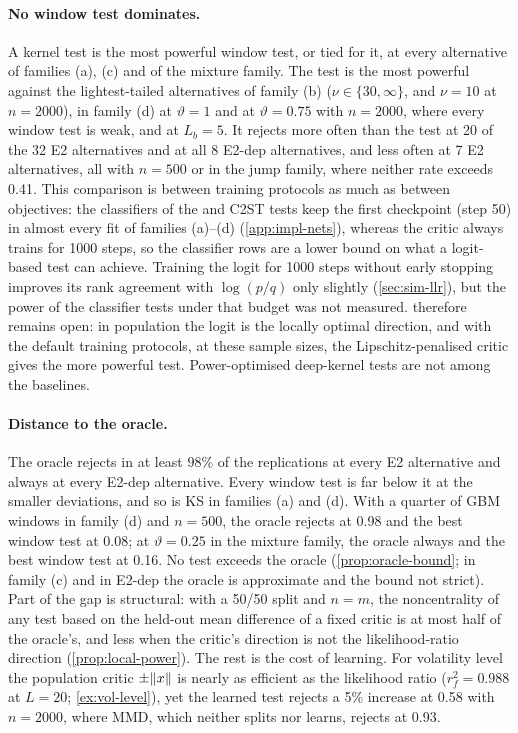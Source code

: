 \paragraph{No window test dominates.}
A kernel test is the most powerful window test, or tied for it, at every alternative of families
(a), (c) and of the mixture family. The \WC{} test is the most powerful against the lightest-tailed
alternatives of family (b) ($\nu\in\{30,\infty\}$, and $\nu=10$ at $n=2000$), in family (d) at
$\vartheta=1$ and at $\vartheta=0.75$ with $n=2000$, where every window test is weak, and at
$L_b=5$. It rejects more often than the \LRC{} test at 20 of the 32 E2 alternatives and at all 8
E2-dep alternatives, and less often at 7 E2 alternatives, all with $n=500$ or in the jump family,
where neither rate exceeds 0.41. This comparison is between training protocols as much as between
objectives: the classifiers of the \LRC{} and C2ST tests keep the first checkpoint (step 50) in
almost every fit of families (a)--(d) (\cref{app:impl-nets}), whereas the critic always trains
for 1000 steps, so the classifier rows are a lower bound on what a logit-based test can achieve.
Training the logit for 1000 steps without early stopping improves its rank agreement with
$\log(p/q)$ only slightly (\cref{sec:sim-llr}), but the power of the classifier tests under that
budget was not measured.  therefore remains open: in population the logit is
the locally optimal direction, and with the default training protocols, at these sample sizes,
the Lipschitz-penalised critic gives the more powerful test. Power-optimised deep-kernel tests
\citep{liu2020learning} are not among the baselines.

\paragraph{Distance to the oracle.}
The oracle rejects in at least 98\% of the replications at every E2 alternative and always at every
E2-dep alternative. Every window test is far below it at the smaller deviations, and so is KS in
families (a) and (d). With a quarter of GBM windows in family (d) and $n=500$, the oracle rejects at
0.98 and the best window test at 0.08; at $\vartheta=0.25$ in the mixture family, the oracle always
and the best window test at 0.16. No test exceeds the oracle (\cref{prop:oracle-bound}; in family
(c) and in E2-dep the oracle is approximate and the bound not strict). Part of the gap is
structural: with a 50/50 split and $n=m$, the noncentrality of any test based on the held-out mean
difference of a fixed critic is at most half of the oracle's, and less when the critic's direction is not the likelihood-ratio direction
(\cref{prop:local-power}). The rest is the cost of learning. For volatility level the population
critic $\pm\lVert x\rVert$ is nearly as efficient as the likelihood ratio ($r_f^2=0.988$ at $L=20$;
\cref{ex:vol-level}), yet the learned \WC{} test rejects a 5\% increase at 0.58 with $n=2000$,
where MMD, which neither splits nor learns, rejects at 0.93.

